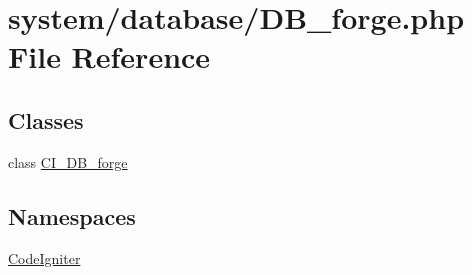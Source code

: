 \hypertarget{_d_b__forge_8php}{}\section{system/database/\+D\+B\+\_\+forge.php File Reference}
\label{_d_b__forge_8php}
\subsection*{Classes}
\begin{DoxyCompactItemize}
\item 
class \mbox{\hyperlink{class_c_i___d_b__forge}{C\+I\+\_\+\+D\+B\+\_\+forge}}
\end{DoxyCompactItemize}
\subsection*{Namespaces}
\begin{DoxyCompactItemize}
\item 
 \mbox{\hyperlink{namespace_code_igniter}{Code\+Igniter}}
\end{DoxyCompactItemize}
